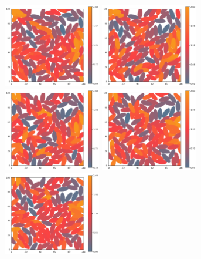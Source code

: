 \begin{figure}[!ht]
    \centering
    \includegraphics[width=0.38\textwidth]{./figures/runs/delta_a_01/run01}
    \includegraphics[width=0.38\textwidth]{./figures/runs/delta_a_01/run02}
    \includegraphics[width=0.38\textwidth]{./figures/runs/delta_a_01/run03}
    \includegraphics[width=0.38\textwidth]{./figures/runs/delta_a_01/run04}
    \includegraphics[width=0.38\textwidth]{./figures/runs/delta_a_01/run05}

\end{figure}
